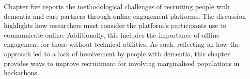 \begin{itemize}
    Chapter five reports the methodological challenges of recruiting people with dementia and care partners through online engagement platforms. The discussion highlights how researchers must consider the platform's participants use to communicate online. Additionally, this includes the importance of offline engagement for those without technical abilities. As such, reflecting on how the approach led to a lack of involvement by people with dementia, this chapter provides ways to improve recruitment for involving marginalised populations in hackathons.
\end{itemize}
